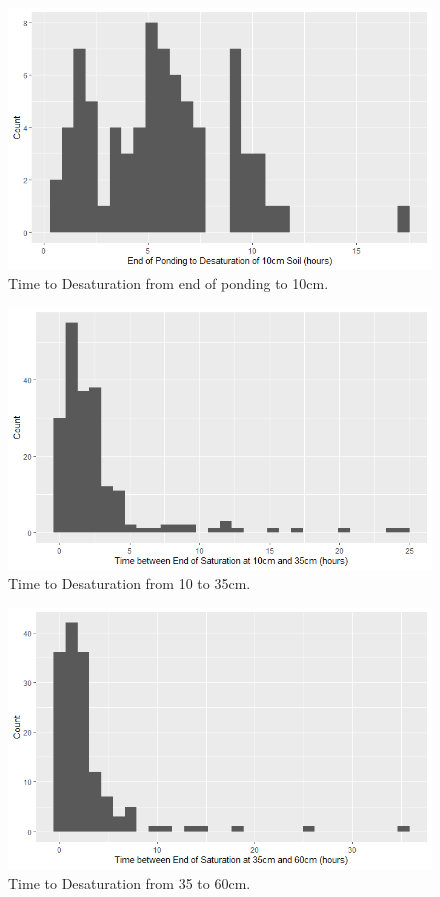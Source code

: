 \begin{figure}[ht!]
	\centering
	\includegraphics[width=\textwidth]{gfx/chapter-data-analysis/drying_rate_pond_10.png}
	\caption{Time to Desaturation from end of ponding to 10cm.}
	\label{fig:drying-rate-pond-10}
\end{figure}

\begin{figure}[ht!]
	\centering
	\includegraphics[width=\textwidth]{gfx/chapter-data-analysis/drying_rate_10_35.png}
	\caption{Time to Desaturation from 10 to 35cm.}
	\label{fig:drying-rate-10-35}
\end{figure}

\begin{figure}[ht!]
	\centering
	\includegraphics[width=\textwidth]{gfx/chapter-data-analysis/drying_rate_35_60.png}
	\caption{Time to Desaturation from 35 to 60cm.}
	\label{fig:drying-rate-35-60}
\end{figure}

